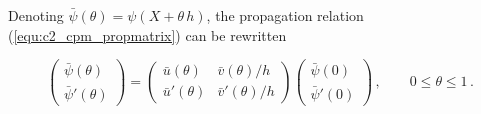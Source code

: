 Denoting $\bar{\psi}(\theta) =\psi(X+\theta\,h)$, the propagation relation (\ref{equ:c2_cpm_propmatrix}) can be rewritten

\begin{equation}
    \begin{pmatrix}\bar{\psi}(\theta)\\ \bar{\psi}'(\theta)\end{pmatrix}
    = \begin{pmatrix} \bar{u}(\theta) & \bar{v}(\theta)/h \\ \bar{u}'(\theta) & \bar{v}'(\theta)/h \end{pmatrix} \begin{pmatrix} \bar{\psi}(0) \\ \bar{\psi}'(0) \end{pmatrix} \,, \qquad %
    0 \leq \theta \leq 1 \,. \label{equ:c2_cpm_propmatrix2}
\end{equation}

